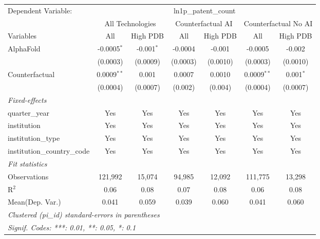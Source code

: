 \begingroup
\centering
\begin{tabular}{lcccccc}
   \tabularnewline \midrule \midrule
   Dependent Variable: & \multicolumn{6}{c}{ln1p\_patent\_count}\\
 & \multicolumn{2}{c}{All Technologies} & \multicolumn{2}{c}{Counterfactual AI} & \multicolumn{2}{c}{Counterfactual No AI} \\
\cmidrule(lr){1-1}\cmidrule(lr){2-3} \cmidrule(lr){4-5} \cmidrule(lr){6-7}
Variables & \multicolumn{1}{c}{All} & \multicolumn{1}{c}{High PDB} & \multicolumn{1}{c}{All} & \multicolumn{1}{c}{High PDB} & \multicolumn{1}{c}{All} & \multicolumn{1}{c}{High PDB} \\
\cmidrule(lr){1-1}\cmidrule(lr){2-2} \cmidrule(lr){3-3} \cmidrule(lr){4-4} \cmidrule(lr){5-5} \cmidrule(lr){6-6} \cmidrule(lr){7-7}
   AlphaFold                    & -0.0005$^{*}$ & -0.001$^{*}$ & -0.0004  & -0.001   & -0.0005       & -0.002\\   
                                & (0.0003)      & (0.0009)     & (0.0003) & (0.0010) & (0.0003)      & (0.0010)\\   
   Counterfactual               & 0.0009$^{**}$ & 0.001        & 0.0007   & 0.0010   & 0.0009$^{**}$ & 0.001$^{*}$\\   
                                & (0.0004)      & (0.0007)     & (0.002)  & (0.004)  & (0.0004)      & (0.0007)\\   
   \midrule
   \emph{Fixed-effects}\\
   quarter\_year                & Yes           & Yes          & Yes      & Yes      & Yes           & Yes\\  
   institution                  & Yes           & Yes          & Yes      & Yes      & Yes           & Yes\\  
   institution\_type            & Yes           & Yes          & Yes      & Yes      & Yes           & Yes\\  
   institution\_country\_code   & Yes           & Yes          & Yes      & Yes      & Yes           & Yes\\  
   \midrule
   \emph{Fit statistics}\\
   Observations                 & 121,992       & 15,074       & 94,985   & 12,092   & 111,775       & 13,298\\  
   R$^2$                        & 0.06          & 0.08         & 0.07     & 0.08     & 0.06          & 0.08\\  
Mean(Dep. Var.) & 0.041 & 0.059 & 0.039 & 0.060 & 0.041 & 0.060 \\
   \midrule \midrule
   \multicolumn{7}{l}{\emph{Clustered (pi\_id) standard-errors in parentheses}}\\
   \multicolumn{7}{l}{\emph{Signif. Codes: ***: 0.01, **: 0.05, *: 0.1}}\\
\end{tabular}
\par\endgroup
